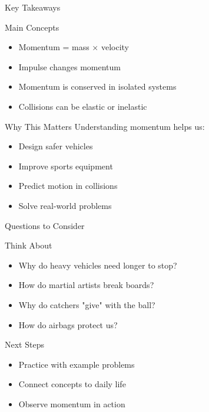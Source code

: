 \documentclass{beamer}
\begin{document}
\begin{frame}{Key Takeaways}
\begin{block}{Main Concepts}
\begin{itemize}
\item Momentum = mass × velocity
\item Impulse changes momentum
\item Momentum is conserved in isolated systems
\item Collisions can be elastic or inelastic
\end{itemize}
\end{block}

\begin{alertblock}{Why This Matters}
Understanding momentum helps us:
\begin{itemize}
\item Design safer vehicles
\item Improve sports equipment
\item Predict motion in collisions
\item Solve real-world problems
\end{itemize}
\end{alertblock}
\end{frame}

\begin{frame}{Questions to Consider}
\begin{block}{Think About}
\begin{itemize}
\item Why do heavy vehicles need longer to stop?
\item How do martial artists break boards?
\item Why do catchers "give" with the ball?
\item How do airbags protect us?
\end{itemize}
\end{block}

\begin{block}{Next Steps}
\begin{itemize}
\item Practice with example problems
\item Connect concepts to daily life
\item Observe momentum in action
\end{itemize}
\end{block}
\end{frame}
\end{document}

